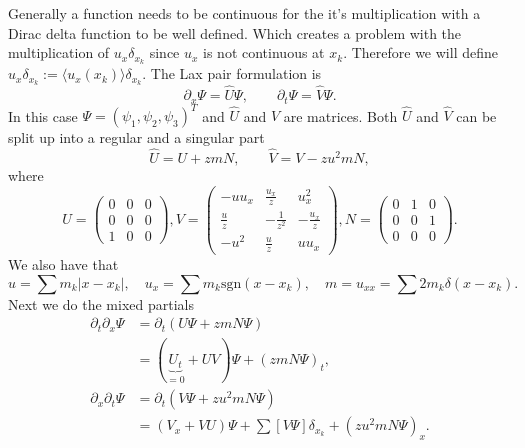 \documentclass[english,master]{liumaiex}
\theoremstyle{plain}
\theoremstyle{definition}
\newcommand{\sgn}{\text{sgn}}
\begin{document}
Generally a function needs to be continuous for the it's multiplication with a Dirac delta function to be well defined. Which creates a problem with the multiplication of $u_x \delta_{x_k}$ since $u_x$ is not continuous at $x_k$. Therefore we will define $u_x \delta_{x_k} := \langle u_x(x_k) \rangle \delta_{x_k}$. The Lax pair formulation is
\begin{equation}
	\partial_x \Psi = \hat{U} \Psi, \qquad \partial_t \Psi = \hat{V} \Psi.
\end{equation}
In this case $\Psi = (\psi_1, \psi_2, \psi_3)^T$ and $\hat{U}$ and $\hat{V}$ are matrices. Both $\hat{U}$ and $\hat{V}$ can be split up into a regular and a singular part
%
\begin{equation}
\hat{U} = U + zmN, \qquad \hat{V} = V - zu^2mN,
\end{equation}
where
\begin{equation}
U =
	\begin{pmatrix}
	0 & 0 & 0 \\
	0 & 0 & 0 \\
	1 & 0 & 0
	\end{pmatrix},
V = 
	\begin{pmatrix}
	-u u_x & \frac{u_x}{z} & u_x^2 \\
	\frac{u}{z} & - \frac{1}{z^2} & - \frac{u_x}{z} \\
	-u^2 & \frac{u}{z} & uu_x
	\end{pmatrix},
N =
	\begin{pmatrix}
	0 & 1 & 0 \\
	0 & 0 & 1 \\
	0 & 0 & 0
	\end{pmatrix}.
\end{equation}
%
We also have that
\begin{equation}
	u = \sum m_k |x - x_k|, \quad u_x = \sum m_k \sgn(x - x_k), \quad m = u_{xx} = \sum 2 m_k \delta(x - x_k).
\end{equation}
Next we do the mixed partials
\begin{equation}
\begin{aligned}
	\partial_t \partial_x \Psi &= \partial_t (U \Psi + zmN \Psi) \\ 
	&= (\underbrace{U_t}_{=0} + UV) \Psi + (zm N \Psi)_t, \\
	\partial_x \partial_t \Psi &= \partial_t (V \Psi + zu^2mN \Psi) \\
	&= (V_x + VU) \Psi + \sum [ V \Psi ] \delta_{x_k} + (zu^2m N \Psi)_x.
\end{aligned}
\end{equation}
\end{document}
